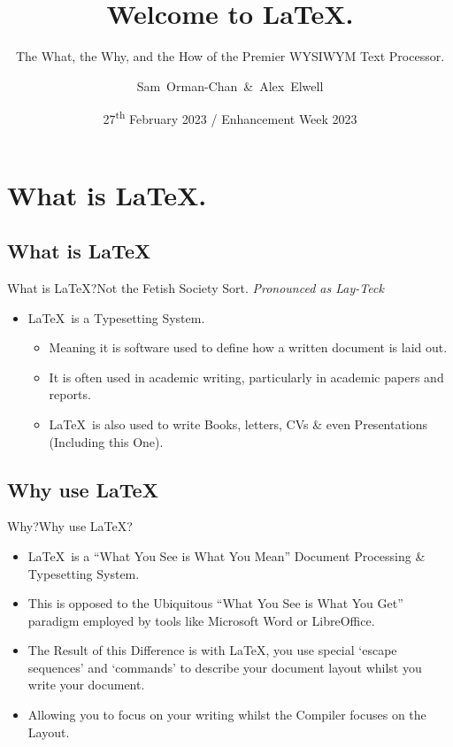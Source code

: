 \documentclass{beamer}
\title[] %
{Welcome to \LaTeX.}
\subtitle
{The What, the Why, and the How of the Premier WYSIWYM Text Processor.} %
\author[] %
{Sam~Orman-Chan~\&~Alex~Elwell}
\institute[] %
{%
 University of Lincoln --- School of Computer Science}
\date[] %
{27\textsuperscript{th} February 2023 / Enhancement Week 2023}
\begin{document}
\begin{frame}
  \titlepage
\end{frame}




\section{What is \LaTeX.}
\subsection{What is \LaTeX}
\begin{frame}{What is LaTeX?}{Not the Fetish Society Sort.}
\emph{Pronounced as Lay-Teck}
  \begin{itemize}
  \item
   \LaTeX~is a Typesetting System.
  \begin{itemize}\item Meaning it is software used to define how a written document is laid out.
  \item It is often used in academic writing, particularly in academic papers and reports.
  \item \LaTeX~is also used to write Books, letters, CVs \& even Presentations (Including this One).
   \end{itemize}
  \end{itemize}
\end{frame}
\subsection{Why use \LaTeX}
\begin{frame}{Why?}{Why use \LaTeX?}
\begin{itemize}
\item \LaTeX~is a ``What You See is What You Mean'' Document Processing \& Typesetting System.
\item This is opposed to the Ubiquitous ``What You See is What You Get'' paradigm employed by tools like Microsoft Word or LibreOffice.
\item The Result of this Difference is with \LaTeX, you use special `escape sequences' and `commands' to describe your document layout whilst you write your document. 
\item Allowing you to focus on your writing whilst the Compiler focuses on the Layout.
\end{itemize}
\end{frame}
\end{document}

